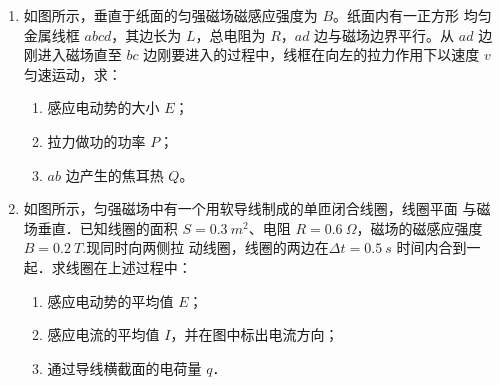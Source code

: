 \begin{enumerate}
\item
{}
如图所示，垂直于纸面的匀强磁场磁感应强度为 $ B $。纸面内有一正方形
均匀金属线框 $ abcd $，其边长为 $ L $，总电阻为 $ R $，$ ad $ 边与磁场边界平行。从 $ ad $ 边刚进入磁场直至 $ bc $
边刚要进入的过程中，线框在向左的拉力作用下以速度 $ v $ 匀速运动，求：
\begin{enumerate}
\item
感应电动势的大小 $ E $；
\item 
拉力做功的功率 $ P $；
\item 
$ ab $ 边产生的焦耳热 $ Q $。

\end{enumerate}
\begin{figure}[h!]
\flushright

\end{figure}



\item 
{}
如图所示，匀强磁场中有一个用软导线制成的单匝闭合线圈，线圈平面
与磁场垂直．已知线圈的面积 $ S=0.3 \ m^{2} $、电阻 $ R=0.6 \ \Omega $，磁场的磁感应强度 $ B=0.2 \ T $.现同时向两侧拉
动线圈，线圈的两边在$ \Delta t=0.5 \ s $ 时间内合到一起．求线圈在上述过程中：
\begin{enumerate}
\item
感应电动势的平均值 $ E $；
\item 
感应电流的平均值 $ I $，并在图中标出电流方向；
\item 
通过导线横截面的电荷量 $ q $．



\end{enumerate}
\end{enumerate}
